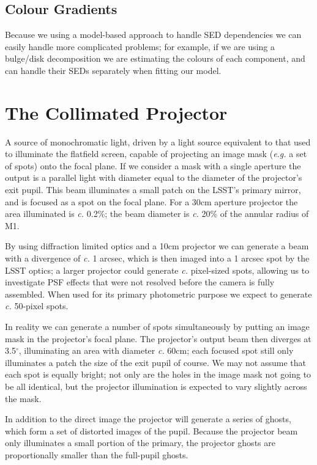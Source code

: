 \documentclass[12pt]{article}
\renewcommand{\c}{\textit{c.}\xspace}
\newcommand{\eg}{\textit{e.g.}\xspace}
\begin{document}
\subsection{Colour Gradients}

Because we using a model-based approach to handle SED dependencies we can easily handle more complicated
problems; for example, if we are using a bulge/disk decomposition we are estimating the colours of each
component, and can handle their SEDs separately when fitting our model.

\appendix

\section{The Collimated Projector}
\label{appProjector}

A source of monochromatic light, driven by a light source equivalent to that used to illuminate the flatfield
screen, capable of projecting an image mask (\eg a set of spots) onto the focal plane.  If we consider a mask
with a single aperture the output is a parallel light with diameter equal to the diameter of the projector's
exit pupil.  This beam illuminates a small patch on the LSST's primary mirror, and is focused as a spot on the
focal plane.  For a 30cm aperture projector the area illuminated is \c 0.2\%; the beam diameter is \c 20\%
of the annular radius of M1.

By using diffraction limited optics and a 10cm projector we can generate a beam with a divergence of \c 1
arcsec, which is then imaged into a 1 arcsec spot by the LSST optics; a larger projector could generate
\c pixel-sized spots, allowing us to investigate PSF effects that were not resolved before the camera
is fully assembled.  When used for its primary photometric purpose we expect to generate \c 50-pixel
spots.

In reality we can generate a number of spots simultaneously by putting an image mask in the projector's focal
plane.  The projector's output beam then diverges at 3.5$^\circ$, illuminating an area with diameter \c 60cm;
each focused spot still only illuminates a patch the size of the exit pupil of course.  We may not assume that
each spot is equally bright; not only are the holes in the image mask not going to be all identical, but the
projector illumination is expected to vary slightly across the mask.

In addition to the direct image the projector will generate a series of ghosts, which form a set
of distorted images of the pupil.  Because the projector beam only illuminates a small portion of
the primary, the projector ghosts are proportionally smaller than the full-pupil ghosts.
\end{document}
